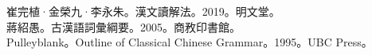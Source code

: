 崔完植·金榮九·李永朱。漢文讀解法。2019。明文堂。\\
蔣紹愚。古漢語詞彙綱要。2005。商敄印書館。\\
Pulleyblank。Outline of Classical Chinese Grammar。1995。UBC Press。\\
